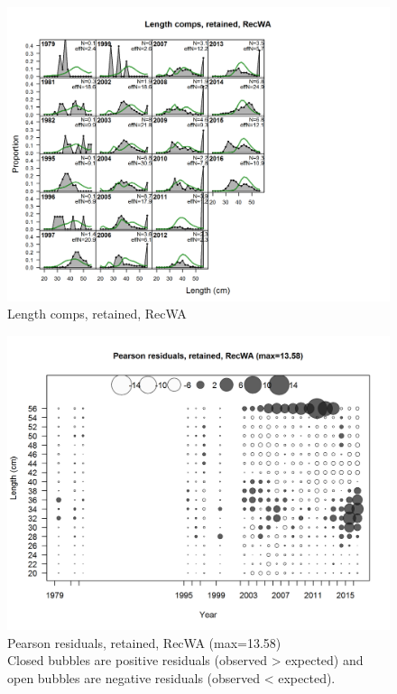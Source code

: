 \documentclass[12pt,]{article}
\begin{document}
\begin{figure}[htbp]
\centering
\includegraphics{./r4ss/plots_mod1/comp_lenfit_flt4mkt2.png}
\caption{Length comps, retained, RecWA
\label{fig:mod1_18_comp_lenfit_flt4mkt2}}
\end{figure}

\begin{figure}[htbp]
\centering
\includegraphics{./r4ss/plots_mod1/comp_lenfit_residsflt4mkt2.png}
\caption{Pearson residuals, retained, RecWA (max=13.58)\\
Closed bubbles are positive residuals (observed \textgreater{} expected)
and open bubbles are negative residuals (observed \textless{} expected).
\label{fig:mod1_19_comp_lenfit_residsflt4mkt2}}
\end{figure}
\end{document}
